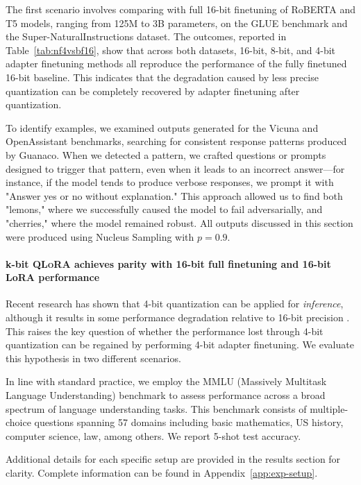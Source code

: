 The first scenario involves comparing with full 16-bit finetuning of RoBERTA and T5 models, ranging from 125M to 3B parameters, on the GLUE benchmark and the Super-NaturalInstructions dataset. The outcomes, reported in Table~\ref{tab:nf4vsbf16}, show that across both datasets, 16-bit, 8-bit, and 4-bit adapter finetuning methods all reproduce the performance of the fully finetuned 16-bit baseline. This indicates that the degradation caused by less precise quantization can be completely recovered by adapter finetuning after quantization.

To identify examples, we examined outputs generated for the Vicuna and OpenAssistant benchmarks, searching for consistent response patterns produced by {Guanaco}. When we detected a pattern, we crafted questions or prompts designed to trigger that pattern, even when it leads to an incorrect answer—for instance, if the model tends to produce verbose responses, we prompt it with "Answer yes or no without explanation." This approach allowed us to find both "lemons," where we successfully caused the model to fail adversarially, and "cherries," where the model remained robust. All outputs discussed in this section were produced using Nucleus Sampling \cite{holtzmancurious} with $p=0.9$.

\paragraph{k-bit \textsc{QLoRA} achieves parity with 16-bit full finetuning and 16-bit LoRA performance} Recent research has shown that 4-bit quantization can be applied for \emph{inference}, although it results in some performance degradation relative to 16-bit precision \citep{dettmers2022case,frantar2022gptq}. This raises the key question of whether the performance lost through 4-bit quantization can be regained by performing 4-bit adapter finetuning. We evaluate this hypothesis in two different scenarios.

In line with standard practice, we employ the MMLU (Massively Multitask Language Understanding) benchmark \citep{hendrycksmeasuring} to assess performance across a broad spectrum of language understanding tasks. This benchmark consists of multiple-choice questions spanning 57 domains including basic mathematics, US history, computer science, law, among others. We report 5-shot test accuracy.

Additional details for each specific setup are provided in the results section for clarity. Complete information can be found in Appendix~\ref{app:exp-setup}.

